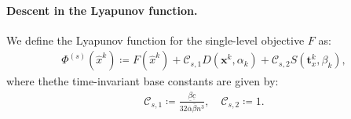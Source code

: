 \documentclass{article}
\theoremstyle{plain}
\theoremstyle{definition}
\theoremstyle{remark}
\begin{document}
\paragraph{Descent in the Lyapunov function.}
We define the Lyapunov function for the single-level objective $F$ as:
\begin{align}\label{eq:lyapunov_def_single}
    \Phi^{(s)}({\hat{x}}^k) \coloneqq F({\hat{x}}^k) + \mathcal{C}_{s,1} D(\mathbf{x}^{k}, \alpha_{k}) + \mathcal{C}_{s,2} S(\mathbf{t}_{x}^{k}, \beta_{k}),
\end{align}
where thethe time-invariant base constants are given by:
\begin{align}\label{eq:lyapunov_coeffs_single}
    \mathcal{C}_{s,1} \coloneqq \frac{\underline{\beta}\underline{c}  }{32 \overline{\alpha}\overline{\beta} n^{3}}, \quad \mathcal{C}_{s,2} \coloneqq 1.
\end{align}
\end{document}
